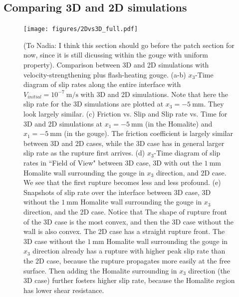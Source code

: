 \documentclass[final,a4paper]{elsarticle}
\newif\ifincludetext
\begin{document}
\FloatBarrier
\subsection{Comparing 3D and 2D simulations} \label{subsec:3Dvs2DSimulations}
\ifincludetext{
Since the specimen is $200\ \mathrm{mm}$ long and wide, 
but only $10\ \mathrm{mm}$ thick, 
a natural question to ask is how much feature we will be able to capture just with a 2D simulation in plane-stress. 
We here run a case with the same material parameters and initial condition as case 3 in 2D. 
However, 
in 2D simulation there will be no Homalite region surrounding the gouge zone as the 3D simulation, 
since $x_3$ direction does not exist. 
It turns out that the surrounding Homalite region makes it easier for the rupture to propagate, 
and the difference is noticable. 
}
\fi
\begin{figure}[htbp]
    \centering
    \texttt{[image: figures/2Dvs3D\_full.pdf]}
    \caption{(To Nadia: I think this section should go before the patch section for now, since it is still dicussing within the gouge with uniform property). 
    Comparison between 3D and 2D simulations with velocity-strengthening plus flash-heating gouge. 
    (a-b) $x_3$-Time diagram of slip rates along the entire interface with $V_{initial} = 10^{-7}\ \mathrm{m/s}$ with 3D and 2D simulations. Note that here the slip rate for the 3D simulations are plotted at $x_3 = -5\ \mathrm{mm}$. 
    They look largely similar. 
    (c) Friction vs. Slip and Slip rate vs. Time for 3D and 2D simulations at $x_1 = -5\ \mathrm{mm}$ (in the Homalite) and $x_1 = -5\ \mathrm{mm}$ (in the gouge). 
    The friction coefficient is largely similar between 3D and 2D cases, 
    while the 3D case has in general larger slip rate as the rupture first arrives. 
    (d) $x_3$-Time diagram of slip rates in ``Field of View" between 3D case, 
    3D with out the $1\ \mathrm{mm}$ Homalite wall surrounding the gouge in $x_3$ direction, and 2D case. 
    We see that the first rupture becomes less and less profound. 
    (e) Snapshots of slip rate over the interface between 3D case, 
    3D without the $1\ \mathrm{mm}$ Homalite wall surrounding the gouge in $x_3$ direction, and the 2D case. 
    Notice that The shape of rupture front of the 3D case is the most convex, 
    and then the 3D case without the wall is also convex. 
    The 2D case has a straight rupture front. 
    The 3D case without the $1\ \mathrm{mm}$ Homalite wall surrounding the gouge in $x_3$ direction 
    already has a rupture with higher peak slip rate than the 2D case, 
    because the rupture propagates more easily at the free surface. 
    Then adding the Homalite surrounding in $x_3$ direction (the 3D case) further fosters higher slip rate, 
    because the Homalite region has lower shear resistance.}
    \label{fig:2Dvs3D_full}
\end{figure}
\end{document}
